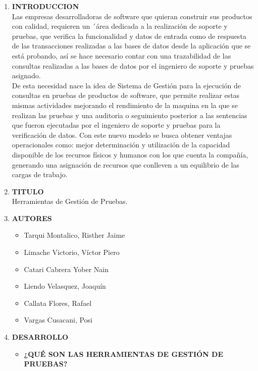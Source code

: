 \documentclass[12pt,a4paper,oneside]{book}
\begin{document}
	\begin{enumerate}
		\item \textbf{INTRODUCCION} \\
			Las empresas desarrolladoras de software que quieran construir sus productos con calidad, requieren un ´área dedicada a la realización de soporte y pruebas, que verifica la funcionalidad y datos de entrada como de respuesta de las transacciones realizadas a las bases de datos desde la aplicación que se está probando, así se hace necesario contar con una trazabilidad de las consultas realizadas a las bases de datos por el ingeniero de soporte y pruebas asignado. \\
			
			De esta necesidad nace la idea de Sistema de Gestión para la ejecución de consultas en pruebas de productos de software, que permite realizar estas mismas actividades mejorando el rendimiento de la maquina en la que se realizan las pruebas y una auditoria o seguimiento posterior a las sentencias que fueron ejecutadas por el ingeniero de soporte y pruebas para la verificación de datos. Con este nuevo modelo se busca obtener ventajas operacionales como: mejor determinación y utilización de la capacidad disponible de los recursos físicos y humanos con los que cuenta la compañía, generando una asignación de recursos que conlleven a un equilibrio de las cargas de trabajo.\\
			
		\item \textbf{TITULO} \\
			Herramientas de Gestión de Pruebas. \\
		\item \textbf{AUTORES}
			\begin{itemize}
				 \item Tarqui Montalico, Risther Jaime 
				 \item Limache Victorio, V\'ictor Piero 
				 \item Catari Cabrera Yober Nain 
				 
				 \item Liendo Velasquez, Joaqu\'in 
				 \item Callata Flores, Rafael 
				 \item Vargas Cusacani, Posi 
			\end{itemize}
		\item \textbf{DESARROLLO}
			\begin{itemize}
				\item \textbf{¿QUÉ SON LAS HERRAMIENTAS DE GESTIÓN DE PRUEBAS?}\\
				

\end{itemize}
\end{enumerate}
\end{document}
